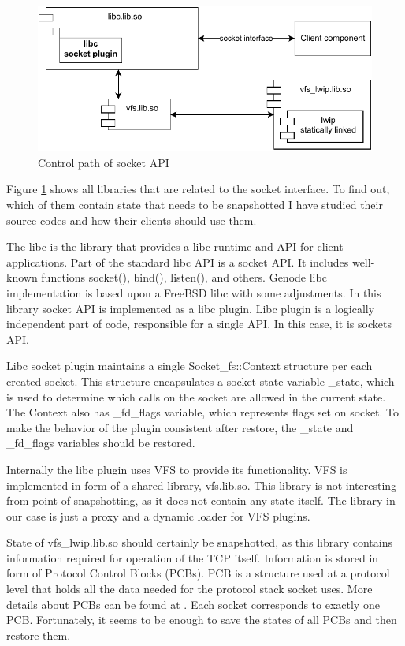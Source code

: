 \begin{figure}
    \centering
    \includegraphics[]{figs/vfs_components.drawio.pdf}
    \caption{Control path of socket API}
    \label{fig:socket_via_vfs}
\end{figure}

Figure \ref{fig:socket_via_vfs} shows all libraries that are related to the
socket interface. To find out, which of them contain state that needs to be
snapshotted I have studied their source codes and how their clients should use
them. 

The libc is the library that provides a libc runtime and API for client
applications. Part of the standard libc API is a socket API. It includes
well-known functions socket(), bind(), listen(), and others. Genode libc
implementation is based upon a FreeBSD libc with some adjustments. In this
library socket API is implemented as a libc plugin. Libc plugin is a logically
independent part of code, responsible for a single API. In this case, it is
sockets API.  

Libc socket plugin maintains a single Socket\_fs::Context structure per each
created socket. This structure encapsulates a socket state variable \_state,
which is used to determine which calls on the socket are allowed in the current
state. The Context also has \_fd\_flags variable, which represents flags set on
socket. To make the behavior of the plugin consistent after restore, the \_state
and \_fd\_flags variables should be restored.

Internally the libc plugin uses VFS to provide its functionality. VFS is
implemented in form of a shared library, vfs.lib.so. This library is not
interesting from point of snapshotting, as it does not contain any state
itself.  The library in our case is just a proxy and a dynamic loader for VFS
plugins.

State of vfs\_lwip.lib.so should certainly be snapshotted, as this library
contains information required for operation of the TCP itself. Information is
stored in form of Protocol Control Blocks (PCBs). PCB is a structure used at a
protocol level that holds all the data needed for the protocol stack socket
uses. More details about PCBs can be found at \cite{stevens1996tcp}. Each
socket corresponds to exactly one PCB. Fortunately, it seems to be enough to
save the states of all PCBs and then restore them.

